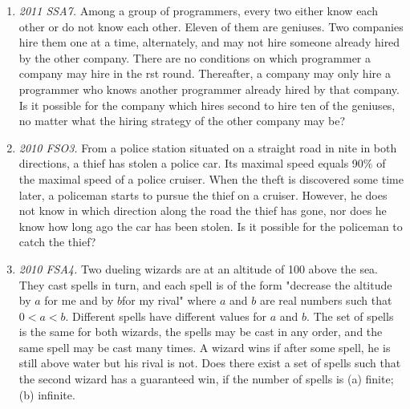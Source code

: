 \documentclass[11pt,a4paper]{article}
\begin{document}
\begin{enumerate}
\item\emph {2011 SSA7.} Among a group of programmers, every two either know each other or do not know each other.
Eleven of them are geniuses.  Two companies hire them one at a time, alternately, and may
not  hire  someone  already  hired  by  the  other  company.   There  are  no  conditions  on  which
programmer a company may hire in the  rst round.  Thereafter, a company may only hire a
programmer who knows another programmer already hired by that company.  Is it possible
for the company which hires second to hire ten of the geniuses,  no matter what the hiring
strategy of the other company may be?

\item\emph {2010 FSO3.}  From a police station situated on a straight road in nite in both directions, a thief has stolen
a police car.  Its maximal speed equals 90$\%$ of the maximal speed of a police cruiser.  When
the theft is discovered some time later, a policeman starts to pursue the thief on a cruiser.
However, he does not know in which direction along the road the thief has gone, nor does he
know how long ago the car has been stolen.  Is it possible for the policeman to catch the thief?

\item\emph {2010 FSA4.} Two dueling wizards are at an altitude of 100 above the sea.  They cast spells in turn, and
each spell is of the form "decrease the altitude by $a$ for me and by $b$for my rival" where $a$ and $b$ are real numbers such that $0<a< b$.  Different spells have different values for $a$ and $b$.  The
set of spells is the same for both wizards, the spells may be cast in any order, and the same
spell may be cast many times.  A wizard wins if after some spell, he is still above water but
his rival is not.  Does there exist a set of spells such that the second wizard has a guaranteed
win, if the number of spells is (a) finite; (b) infinite.
\end{enumerate}
\end{document}
